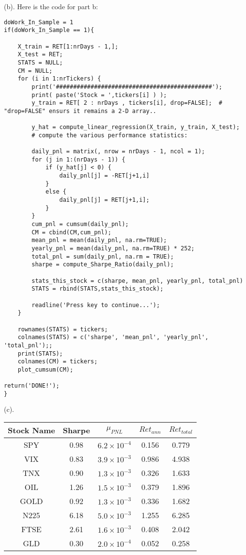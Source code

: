 \documentclass[12pt]{article}
\begin{document}
(b). Here is the code for part b:
\begin{lstlisting}
doWork_In_Sample = 1
if(doWork_In_Sample == 1){

	X_train = RET[1:nrDays - 1,];
	X_test = RET;
	STATS = NULL;
	CM = NULL;
	for (i in 1:nrTickers) {
		print('#############################################');
		print( paste('Stock = ',tickers[i] ) );
		y_train = RET[ 2 : nrDays , tickers[i], drop=FALSE];  # "drop=FALSE" ensurs it remains a 2-D array..
	
		y_hat = compute_linear_regression(X_train, y_train, X_test);
		# compute the various performance statistics:
		
		daily_pnl = matrix(, nrow = nrDays - 1, ncol = 1);
		for (j in 1:(nrDays - 1)) {
			if (y_hat[j] < 0) {
				daily_pnl[j] = -RET[j+1,i]
			}
			else {
				daily_pnl[j] = RET[j+1,i];
			}
		}
		cum_pnl = cumsum(daily_pnl);
		CM = cbind(CM,cum_pnl);
		mean_pnl = mean(daily_pnl, na.rm=TRUE);
		yearly_pnl = mean(daily_pnl, na.rm=TRUE) * 252;
		total_pnl = sum(daily_pnl, na.rm = TRUE);
		sharpe = compute_Sharpe_Ratio(daily_pnl);
		
		stats_this_stock = c(sharpe, mean_pnl, yearly_pnl, total_pnl)
		STATS = rbind(STATS,stats_this_stock);

		readline('Press key to continue...');
	}

	rownames(STATS) = tickers;
	colnames(STATS) = c('sharpe', 'mean_pnl', 'yearly_pnl', 'total_pnl');;
	print(STATS);
	colnames(CM) = tickers;
	plot_cumsum(CM);

return('DONE!');
}
\end{lstlisting}
\hfill \break
(c). \\
\begin{center}
\begin{tabular}{|c|c|c|c|c|}
\hline
Stock Name & Sharpe & $\mu_{PNL}$ & $Ret_{ann}$ & $Ret_{total}$ \\
\hline
SPY & 0.98 & $6.2 \times 10^{-4}$ & 0.156 & 0.779 \\
\hline
VIX & 0.83 & $3.9 \times 10^{-3}$ & 0.986 & 4.938 \\
\hline
TNX & 0.90 & $1.3 \times 10^{-3}$ & 0.326 & 1.633 \\
\hline
OIL & 1.26 & $1.5 \times 10^{-3}$ & 0.379 & 1.896 \\
\hline
GOLD & 0.92 & $1.3 \times 10^{-3}$ & 0.336 & 1.682 \\
\hline
N225 & 6.18 & $5.0 \times 10^{-3}$ & 1.255 & 6.285 \\
\hline
FTSE & 2.61 & $1.6 \times 10^{-3}$ & 0.408 & 2.042 \\
\hline
GLD & 0.30 & $2.0 \times 10^{-4}$ & 0.052 & 0.258 \\
\hline
\end{tabular}
\end{center}
\end{document}
